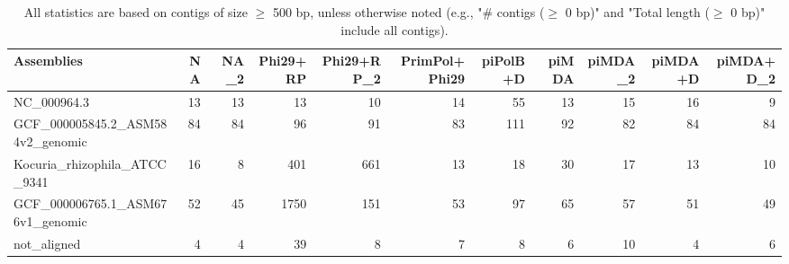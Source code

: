 \documentclass[12pt,a4paper]{article}
\begin{document}
\begin{table}[ht]
\begin{center}
\caption{All statistics are based on contigs of size $\geq$ 500 bp, unless otherwise noted (e.g., "\# contigs ($\geq$ 0 bp)" and "Total length ($\geq$ 0 bp)" include all contigs).}
\begin{tabular}{|l*{10}{|r}|}
\hline
Assemblies & NA & NA\_2 & Phi29+RP & Phi29+RP\_2 & PrimPol+Phi29 & piPolB+D & piMDA & piMDA\_2 & piMDA+D & piMDA+D\_2 \\ \hline
NC\_000964.3 & 13 & 13 & 13 & 10 & 14 & 55 & 13 & 15 & 16 & 9 \\ \hline
GCF\_000005845.2\_ASM584v2\_genomic & 84 & 84 & 96 & 91 & 83 & 111 & 92 & 82 & 84 & 84 \\ \hline
Kocuria\_rhizophila\_ATCC\_9341 & 16 & 8 & 401 & 661 & 13 & 18 & 30 & 17 & 13 & 10 \\ \hline
GCF\_000006765.1\_ASM676v1\_genomic & 52 & 45 & 1750 & 151 & 53 & 97 & 65 & 57 & 51 & 49 \\ \hline
not\_aligned & 4 & 4 & 39 & 8 & 7 & 8 & 6 & 10 & 4 & 6 \\ \hline
\end{tabular}
\end{center}
\end{table}
\end{document}
